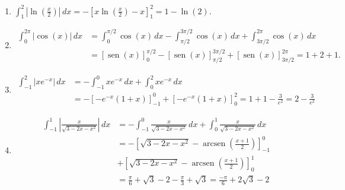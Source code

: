 \documentclass[
  spanish,
  a4paper,
]{scrreport}
\theoremstyle{definition}
\theoremstyle{remark}
\begin{document}
\begin{tcolorbox}[enhanced jigsaw, arc=.35mm, bottomrule=.15mm, bottomtitle=1mm, breakable, colback=white, colbacktitle=quarto-callout-tip-color!10!white, colframe=quarto-callout-tip-color-frame, coltitle=black, left=2mm, leftrule=.75mm, opacityback=0, opacitybacktitle=0.6, rightrule=.15mm, title=\textcolor{quarto-callout-tip-color}{\faLightbulb}\hspace{0.5em}{Solución}, titlerule=0mm, toprule=.15mm, toptitle=1mm]

\begin{enumerate}
\def\labelenumi{\alph{enumi}.}
\item
  \(\int_1^2 \left|\ln\left(\frac{x}{2}\right)\right|\,dx = -\left[x\ln\left(\frac{x}{2}\right)-x\right]_1^2 = 1-\ln(2)\).
\item
  \begin{align*}
   \int_0^{2\pi} |\cos(x)|\,dx 
   &= \int_0^{\pi/2}\cos(x)\,dx -\int_{\pi/2}^{3\pi/2}\cos(x)\,dx + \int_{3\pi/2}^{2\pi}\cos(x)\,dx \\
   &= \left[\operatorname{sen}(x)\right]_0^{\pi/2} - \left[\operatorname{sen}(x)\right]_{\pi/2}^{3\pi/2} + \left[\operatorname{sen}(x)\right]_{3\pi/2}^{2\pi} = 1 + 2 + 1.
   \end{align*}
\item
  \begin{align*}
   \int_{-1}^2 |xe^{-x}|\,dx 
   &= -\int_{-1}^0 xe^{-x}\, dx + \int_{0}^2 xe^{-x}\, dx \\
   &= -\left[-e^{-x}(1+x)\right]_{-1}^0 + \left[-e^{-x}(1+x)\right]_0^2 = 1 + 1-\frac{3}{e^2} = 2-\frac{3}{e^2}
   \end{align*}
\item
  \begin{align*}
   \int_{-1}^1 \left|\frac{x}{\sqrt{3-2x-x^2}}\right|\,dx 
   &= -\int_{-1}^0 \frac{x}{\sqrt{3-2x-x^2}}\,dx + \int_{0}^1 \frac{x}{\sqrt{3-2x-x^2}}\,dx \\
   &= -\left[\sqrt{3-2x-x^2}-\operatorname{arcsen}\left(\frac{x+1}{2}\right)\right]_{-1}^0\\
   &+ \left[\sqrt{3-2x-x^2}-\operatorname{arcsen}\left(\frac{x+1}{2}\right)\right]_{0}^1\\
   &= \frac{\pi}{6}+\sqrt{3}-2 -\frac{\pi}{3}+\sqrt{3} = \frac{-\pi}{6}+2\sqrt{3}-2
   \end{align*}
\end{enumerate}

\end{tcolorbox}
\end{document}

